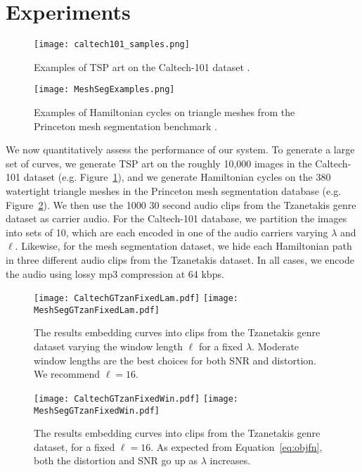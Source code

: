 \documentclass[runningheads]{llncs}
\begin{document}
\section{Experiments}
\label{sec:experiments}



\begin{figure}
  \centering
  \texttt{[image: caltech101\_samples.png]}
  \caption{Examples of TSP art on the Caltech-101 dataset \cite{li_andreeto_ranzato_perona_2022}.}
  \label{fig:caltech101examples}
\end{figure}

\begin{figure}
  \centering
  \texttt{[image: MeshSegExamples.png]}
  \caption{Examples of Hamiltonian cycles on triangle meshes from the Princeton mesh segmentation benchmark \cite{Chen:2009:ABF}.}
  \label{fig:meshsegexamples}
\end{figure}

We now quantitatively assess the performance of our system.  To generate a large set of curves, we generate TSP art on the roughly 10,000 images in the Caltech-101 dataset  \cite{li_andreeto_ranzato_perona_2022} (e.g. Figure~\ref{fig:caltech101examples}), and we generate Hamiltonian cycles on the 380 watertight triangle meshes in the Princeton mesh segmentation database \cite{Chen:2009:ABF} (e.g. Figure~\ref{fig:meshsegexamples}).  We then use the 1000 30 second audio clips from the Tzanetakis genre dataset \cite{tzanetakis2002musical} as carrier audio.  For the Caltech-101 database, we partition the images into sets of 10, which are each encoded in one of the audio carriers varying $\lambda$ and $\ell$.  Likewise, for the mesh segmentation dataset, we hide each Hamiltonian path in three different audio clips from the Tzanetakis dataset.  In all cases, we encode the audio using lossy mp3 compression at 64 kbps.

\begin{figure}
  \centering
  \texttt{[image: CaltechGTzanFixedLam.pdf]}
  \texttt{[image: MeshSegGTzanFixedLam.pdf]}
  \caption{The results embedding curves into clips from the Tzanetakis genre dataset varying the window length $\ell$ for a fixed $\lambda$.  Moderate window lengths are the best choices for both SNR and distortion.  We recommend $\ell=16$.}
  \label{fig:ResultsFixedLam}
\end{figure}

\begin{figure}
  \centering
  \texttt{[image: CaltechGTzanFixedWin.pdf]}
  \texttt{[image: MeshSegGTzanFixedWin.pdf]}
  \caption{The results embedding curves into clips from the Tzanetakis genre dataset, for a fixed $\ell=16$.  As expected from Equation~\ref{eq:objfn}, both the distortion and SNR go up as $\lambda$ increases.}
  \label{fig:ResultsFixedWin}
\end{figure}
\end{document}

